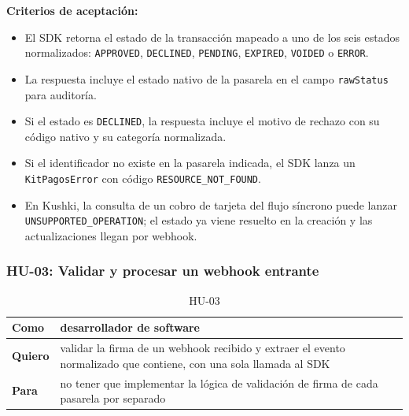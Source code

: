 \textbf{Criterios de aceptación:}
\begin{itemize}
  \item El SDK retorna el estado de la transacción mapeado a uno de los seis estados normalizados: \texttt{APPROVED}, \texttt{DECLINED}, \texttt{PENDING}, \texttt{EXPIRED}, \texttt{VOIDED} o \texttt{ERROR}.
  \item La respuesta incluye el estado nativo de la pasarela en el campo \texttt{rawStatus} para auditoría.
  \item Si el estado es \texttt{DECLINED}, la respuesta incluye el motivo de rechazo con su código nativo y su categoría normalizada.
  \item Si el identificador no existe en la pasarela indicada, el SDK lanza un \texttt{KitPagosError} con código \texttt{RESOURCE\_NOT\_FOUND}.
  \item En Kushki, la consulta de un cobro de tarjeta del flujo síncrono puede lanzar \texttt{UNSUPPORTED\_OPERATION}; el estado ya viene resuelto en la creación y las actualizaciones llegan por webhook.
\end{itemize}

\subsubsection{HU-03: Validar y procesar un webhook entrante}
\begin{table}[H]
  \centering
  \renewcommand{\arraystretch}{1.2}
  \begin{tabularx}{\textwidth}{|l|X|}
    \hline
    \textbf{Como} & desarrollador de software \\
    \hline
    \textbf{Quiero} & validar la firma de un webhook recibido y extraer el evento normalizado que contiene, con una sola llamada al SDK \\
    \hline
    \textbf{Para} & no tener que implementar la lógica de validación de firma de cada pasarela por separado \\
    \hline
  \end{tabularx}
  \caption{HU-03}
  \label{tab:hu-03}
\end{table}


